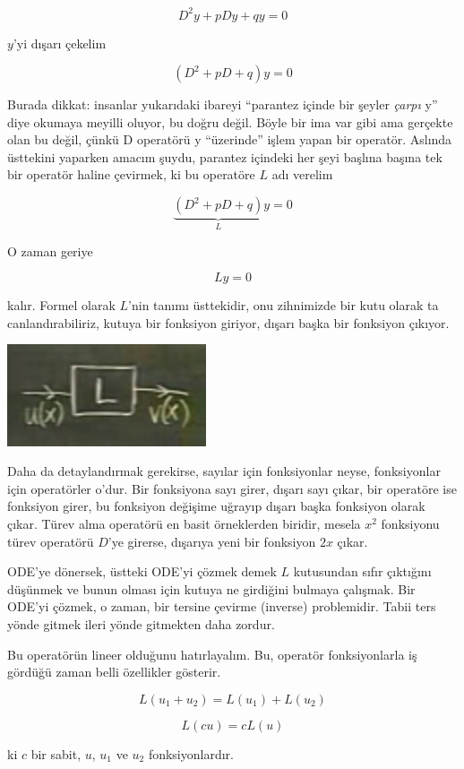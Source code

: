 \documentclass[12pt,fleqn]{article}\usepackage{../../common}
\begin{document}
$$ D^2y + pDy + qy = 0  $$

$y$'yi dışarı çekelim

$$ (D^2 + pD + q)y = 0  $$

Burada dikkat: insanlar yukarıdaki ibareyi ``parantez içinde bir şeyler
{\em çarpı} y'' diye okumaya meyilli oluyor, bu doğru değil. Böyle bir ima
var gibi ama gerçekte olan bu değil, çünkü D operatörü y ``üzerinde'' işlem
yapan bir operatör. Aslında üsttekini yaparken amacım şuydu, parantez
içindeki her şeyi başlına başına tek bir operatör haline çevirmek, ki bu
operatöre $L$ adı verelim

$$ \underbrace{(D^2 + pD + q)}_{L}y = 0  $$

O zaman geriye 

$$ Ly = 0 $$

kalır. Formel olarak $L$'nin tanımı üsttekidir, onu zihnimizde bir kutu
olarak ta canlandırabiliriz, kutuya bir fonksiyon giriyor, dışarı başka bir
fonksiyon çıkıyor.

\includegraphics[height=3cm]{11_1.png}

Daha da detaylandırmak gerekirse, sayılar için fonksiyonlar neyse,
fonksiyonlar için operatörler o'dur. Bir fonksiyona sayı girer, dışarı sayı
çıkar, bir operatöre ise fonksiyon girer, bu fonksiyon değişime uğrayıp
dışarı başka fonksiyon olarak çıkar. Türev alma operatörü en basit
örneklerden biridir, mesela $x^2$ fonksiyonu türev operatörü $D$'ye girerse,
dışarıya yeni bir fonksiyon $2x$ çıkar.

ODE'ye dönersek, üstteki ODE'yi çözmek demek $L$ kutusundan sıfır çıktığını
düşünmek ve bunun olması için kutuya ne girdiğini bulmaya çalışmak. Bir
ODE'yi çözmek, o zaman, bir tersine çevirme (inverse) problemidir. Tabii
ters yönde gitmek ileri yönde gitmekten daha zordur. 

Bu operatörün lineer olduğunu hatırlayalım. Bu, operatör fonksiyonlarla
iş gördüğü zaman belli özellikler gösterir. 

$$ L(u_1 + u_2) = L(u_1) + L(u_2) $$

$$  L(cu) = cL(u)$$

ki $c$ bir sabit, $u$, $u_1$ ve $u_2$ fonksiyonlardır. 
\end{document}
